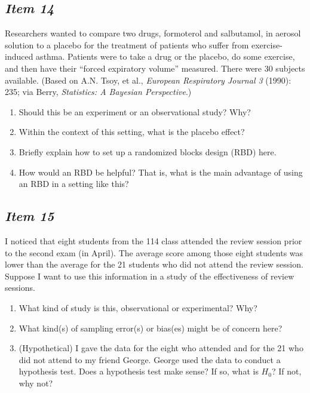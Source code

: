 \documentclass[twoside,openany]{tufte-book}
\begin{document}
\newpage

\subsection{\textbf{\textit{Item 14}}}
Researchers wanted to compare two drugs, formoterol and salbutamol, in aerosol solution to a placebo for the treatment of patients who suffer from exercise-induced asthma.  Patients were to take a drug or the placebo, do some exercise, and then have their ``forced expiratory volume'' measured.  There were 30 subjects available. (Based on A.N. Tsoy, et al., \textit{European Respiratory Journal 3} (1990): 235; via Berry, \textit{Statistics: A Bayesian Perspective}.)
\begin{enumerate}[leftmargin=1cm, itemsep=.2em]
\item Should this be an experiment or an observational study?  Why?
\item Within the context of this setting, what is the placebo effect?
\item Briefly explain how to set up a randomized blocks design (RBD) here.
\item How would an RBD be helpful?  That is, what is the main advantage of using an RBD in a setting like this?
\end{enumerate}

\subsection{\textbf{\textit{Item 15}}}
I noticed that eight students from the 114 class attended the review session prior to the second exam (in April).  The average score among those eight students was lower than the average for the 21 students who did not attend the review session.  Suppose I want to use this information in a study of the effectiveness of review sessions.
\begin{enumerate}[leftmargin=1cm, itemsep=.2em]
\item What kind of study is this, observational or experimental?  Why?
\item What kind(s) of sampling error(s) or bias(es) might be of concern here?
\item (Hypothetical)  I gave the data for the eight who attended and for the 21 who did not attend to my friend George.  George used the data to conduct a hypothesis test.  Does a hypothesis test make sense?  If so, what is $H_0$?  If not, why not?
\end{enumerate}
\end{document}
